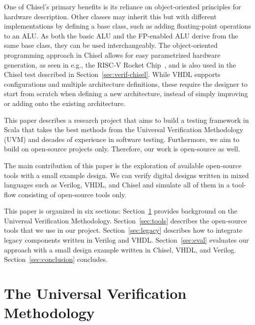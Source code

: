 \documentclass[conference]{IEEEtran}
\newcommand{\todo}[1]{{\color{olive} TODO: #1}}
\newcommand{\kasper}[1]{{\color{purple} Kasper: #1}}
\renewcommand{\todo}[1]{}
\renewcommand{\kasper}[1]{}
\begin{document}
One of Chisel's primary benefits is its reliance on object-oriented principles for hardware description.
Other classes may inherit this but with different implementations by defining a base class, such as adding floating-point operations to an ALU.
As both the basic ALU and the FP-enabled ALU derive from the same base class, they can be used interchangeably. The object-oriented programming approach in Chisel allows for easy parametrized hardware generation,
as seen in e.g., the RISC-V Rocket Chip~\cite{Asanovic2016}, and is also used in the Chisel test described in Section~\ref{sec:verif-chisel}. While VHDL supports configurations and multiple architecture definitions, these require the designer to start from scratch when defining a new architecture, instead of simply improving or adding onto the existing architecture. \kasper{Do we need more than this? Does Verilog have a similar concept?}

This paper describes a research project that aims to build a testing framework in Scala
that takes the best methods from the Universal Verification Methodology (UVM) and
decades of experience in software testing.
Furthermore, we aim to build on open-source projects only. Therefore, our
work is open-source as well.

The main contribution of this paper is the exploration of available open-source tools
with a small example design. We can verify digital designs written in mixed
languages such as Verilog, VHDL, and Chisel and simulate all of them in a tool-flow
consisting of open-source tools only.

This paper is organized in six sections: %
Section~\ref{sec:related} provides background on the Universal Verification Methodology.
Section~\ref{sec:tools} describes the open-source tools that we use in our project.
Section~\ref{sec:legacy} describes how to integrate legacy components written in Verilog and VHDL.
Section~\ref{sec:eval} evaluates our approach with a small design example written in Chisel, VHDL,
and Verilog.
Section~\ref{sec:conclusion} concludes.




\section{The Universal Verification Methodology}
\label{sec:related}


\todo{Related to our work}

\todo{reference for UVM}
\end{document}
